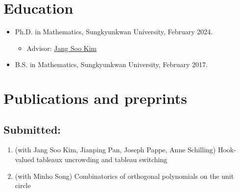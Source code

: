 \documentclass[letterpaper]{article}
\begin{document}
\section*{Education}

\begin{itemize}
  \item Ph.D. in Mathematics, Sungkyunkwan University, February 2024.
    \begin{itemize}
    \item Advisor: \href{https://jangsookim.github.io/}{Jang Soo Kim}
    \end{itemize}

  \item B.S. in Mathematics, Sungkyunkwan University, February 2017.
\end{itemize}









\section*{Publications and preprints}


\subsection*{Submitted:}
\begin{enumerate}
\item (with Jang Soo Kim, Jianping Pan, Joseph Pappe, Anne Schilling) Hook-valued tableaux uncrowding and tableau switching
\item (with Minho Song) Combinatorics of orthogonal polynomials on the unit circle
\end{enumerate}
\end{document}
